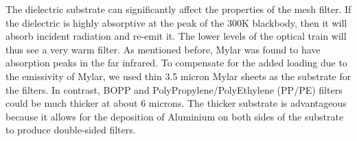 \documentclass[12pt]{article}
\begin{document}


The dielectric substrate can significantly affect the properties of the mesh filter. If the dielectric is highly absorptive at the peak of the 300K blackbody, then it will absorb incident radiation and re-emit it. The lower levels of the optical train will thus see a very warm filter. As mentioned before, Mylar was found to have absorption peaks in the far infrared. To compensate for the added loading due to the emissivity of Mylar, we used thin 3.5 micron Mylar sheets as the substrate for the filters. In contrast, BOPP and PolyPropylene/PolyEthylene (PP/PE) filters could be much thicker at about 6 microns. The thicker substrate is advantageous because it allows for the deposition of Aluminium on both sides of the substrate to produce double-sided filters. 
\end{document}
